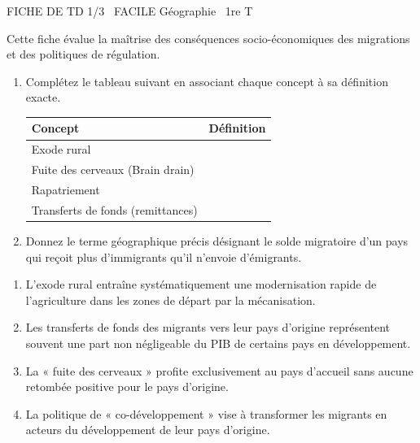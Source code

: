 \documentclass[11pt]{article}
\begin{document}
\begin{tcolorbox}[enhanced,colback=popink,colframe=popink,arc=10pt,boxrule=0pt,left=12pt,right=12pt,top=9pt,bottom=9pt]
{\color{white}\popxbold\small FICHE DE TD 1/3 \textbullet\ FACILE \hfill Géographie \textbullet\ 1re T\par}
\end{tcolorbox}
\vspace{4pt}
Cette fiche évalue la maîtrise des conséquences socio-économiques des migrations et des politiques de régulation.

\begin{exercice}
\begin{enumerate}
    \item Complétez le tableau suivant en associant chaque concept à sa définition exacte.
    
    \begin{tabular}{|p{3.5cm}|p{11cm}|}
    \hline
    \textbf{Concept} & \textbf{Définition} \\
    \hline
    Exode rural & \\
    \hline
    Fuite des cerveaux (Brain drain) & \\
    \hline
    Rapatriement & \\
    \hline
    Transferts de fonds (remittances) & \\
    \hline
    \end{tabular}
    
    \item Donnez le terme géographique précis désignant le solde migratoire d'un pays qui reçoit plus d'immigrants qu'il n'envoie d'émigrants.
\end{enumerate}
\end{exercice}

\begin{exercice}
\begin{enumerate}
    \item L'exode rural entraîne systématiquement une modernisation rapide de l'agriculture dans les zones de départ par la mécanisation.
    \item Les transferts de fonds des migrants vers leur pays d'origine représentent souvent une part non négligeable du PIB de certains pays en développement.
    \item La « fuite des cerveaux » profite exclusivement au pays d'accueil sans aucune retombée positive pour le pays d'origine.
    \item La politique de « co-développement » vise à transformer les migrants en acteurs du développement de leur pays d'origine.
\end{enumerate}
\end{exercice}
\end{document}
